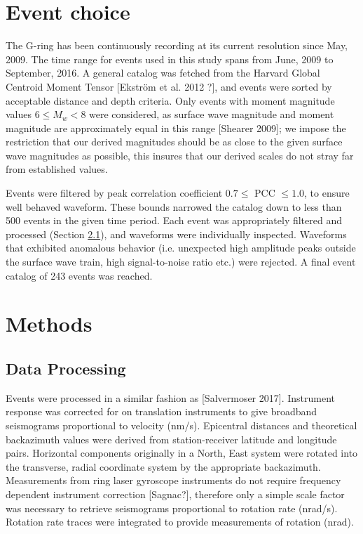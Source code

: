 \documentclass{gji}
\begin{document}
\section{Event choice}
The G-ring has been continuously recording at its current resolution since May, 2009. %
The time range for events used in this study spans from June, 2009 to September, 2016. A general catalog was fetched from the Harvard Global Centroid Moment Tensor [Ekstr\"om et al. 2012 ?], %
and events were sorted by acceptable distance and depth criteria. Only events with moment magnitude values $6 \le M_{w} < 8$ were considered, as surface wave magnitude and moment magnitude are approximately equal in this range [Shearer 2009]; %
we impose the restriction that our derived magnitudes should be as close to the given surface wave magnitudes as possible, this insures that our derived scales do not stray far from established values. 

Events were filtered by peak correlation coefficient $0.7 \le$ PCC $\le 1.0$, to ensure well behaved waveform. These bounds narrowed the catalog down to less than 500 events in the given time period. Each event was appropriately filtered and processed (Section \ref{sec:dataproc}), and waveforms were individually inspected. Waveforms that exhibited anomalous behavior (i.e. unexpected high amplitude peaks outside the surface wave train, high signal-to-noise ratio etc.) were rejected. A final event catalog of 243 events was reached.

\section{Methods}
\subsection{Data Processing}\label{sec:dataproc}
Events were processed in a similar fashion as [Salvermoser 2017]. %
Instrument response was corrected for on translation instruments to give broadband seismograms proportional to velocity (nm/s). Epicentral distances and theoretical backazimuth values were derived from station-receiver latitude and longitude pairs. Horizontal components originally in a North, East system were rotated into the transverse, radial coordinate system by the appropriate backazimuth. Measurements from ring laser gyroscope instruments do not require frequency dependent instrument correction [Sagnac?], %
therefore only a simple scale factor was necessary to retrieve seismograms proportional to rotation rate (nrad/s). Rotation rate traces were integrated to provide measurements of rotation (nrad).
\end{document}
